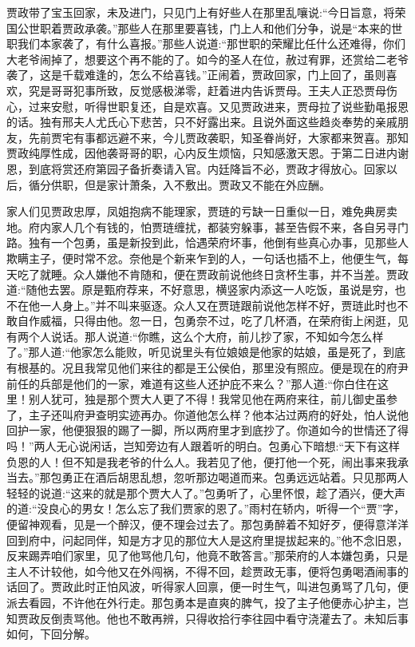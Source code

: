 \begin{parag}
    贾政带了宝玉回家，未及进门，只见门上有好些人在那里乱嚷说:“今日旨意，将荣国公世职着贾政承袭。”那些人在那里要喜钱，门上人和他们分争，说是“本来的世职我们本家袭了，有什么喜报。”那些人说道:“那世职的荣耀比任什么还难得，你们大老爷闹掉了，想要这个再不能的了。如今的圣人在位，赦过宥罪，还赏给二老爷袭了，这是千载难逢的，怎么不给喜钱。”正闹着，贾政回家，门上回了，虽则喜欢，究是哥哥犯事所致，反觉感极涕零，赶着进内告诉贾母。王夫人正恐贾母伤心，过来安慰，听得世职复还，自是欢喜。又见贾政进来，贾母拉了说些勤黾报恩的话。独有邢夫人尤氏心下悲苦，只不好露出来。且说外面这些趋炎奉势的亲戚朋友，先前贾宅有事都远避不来，今儿贾政袭职，知圣眷尚好，大家都来贺喜。那知贾政纯厚性成，因他袭哥哥的职，心内反生烦恼，只知感激天恩。于第二日进内谢恩，到底将赏还府第园子备折奏请入官。内廷降旨不必，贾政才得放心。回家以后，循分供职，但是家计萧条，入不敷出。贾政又不能在外应酬。
\end{parag}


\begin{parag}
    家人们见贾政忠厚，凤姐抱病不能理家，贾琏的亏缺一日重似一日，难免典房卖地。府内家人几个有钱的，怕贾琏缠扰，都装穷躲事，甚至告假不来，各自另寻门路。独有一个包勇，虽是新投到此，恰遇荣府坏事，他倒有些真心办事，见那些人欺瞒主子，便时常不忿。奈他是个新来乍到的人，一句话也插不上，他便生气，每天吃了就睡。众人嫌他不肯随和，便在贾政前说他终日贪杯生事，并不当差。贾政道:“随他去罢。原是甄府荐来，不好意思，横竖家内添这一人吃饭，虽说是穷，也不在他一人身上。”并不叫来驱逐。众人又在贾琏跟前说他怎样不好，贾琏此时也不敢自作威福，只得由他。忽一日，包勇奈不过，吃了几杯酒，在荣府街上闲逛，见有两个人说话。那人说道:“你瞧，这么个大府，前儿抄了家，不知如今怎么样了。”那人道:“他家怎么能败，听见说里头有位娘娘是他家的姑娘，虽是死了，到底有根基的。况且我常见他们来往的都是王公侯伯，那里没有照应。便是现在的府尹前任的兵部是他们的一家，难道有这些人还护庇不来么？”那人道:“你白住在这里！别人犹可，独是那个贾大人更了不得！我常见他在两府来往，前儿御史虽参了，主子还叫府尹查明实迹再办。你道他怎么样？他本沾过两府的好处，怕人说他回护一家，他便狠狠的踢了一脚，所以两府里才到底抄了。你道如今的世情还了得吗！”两人无心说闲话，岂知旁边有人跟着听的明白。包勇心下暗想:“天下有这样负恩的人！但不知是我老爷的什么人。我若见了他，便打他一个死，闹出事来我承当去。”那包勇正在酒后胡思乱想，忽听那边喝道而来。包勇远远站着。只见那两人轻轻的说道:“这来的就是那个贾大人了。”包勇听了，心里怀恨，趁了酒兴，便大声的道:“没良心的男女！怎么忘了我们贾家的恩了。”雨村在轿内，听得一个“贾”字，便留神观看，见是一个醉汉，便不理会过去了。那包勇醉着不知好歹，便得意洋洋回到府中，问起同伴，知是方才见的那位大人是这府里提拔起来的。”他不念旧恩，反来踢弄咱们家里，见了他骂他几句，他竟不敢答言。”那荣府的人本嫌包勇，只是主人不计较他，如今他又在外闯祸，不得不回，趁贾政无事，便将包勇喝酒闹事的话回了。贾政此时正怕风波，听得家人回禀，便一时生气，叫进包勇骂了几句，便派去看园，不许他在外行走。那包勇本是直爽的脾气，投了主子他便赤心护主，岂知贾政反倒责骂他。他也不敢再辨，只得收拾行李往园中看守浇灌去了。未知后事如何，下回分解。
\end{parag}